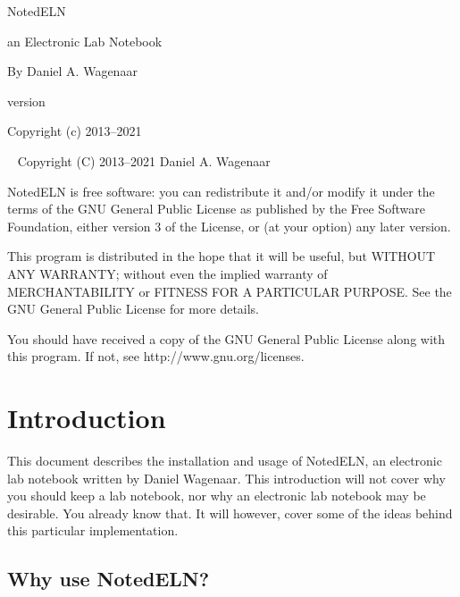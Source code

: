 \documentclass[11pt]{report}
\begin{document}
\thispagestyle{empty}
\begin{centering}
  {\Huge NotedELN}
  \vskip30pt

  {\Large an Electronic Lab Notebook}
  \vskip60pt

 
  {\large By Daniel A. Wagenaar}
  \vfill  

{\large version {}} 
\vskip10pt
  
  
  {Copyright (c) 2013--2021}
  
\end{centering}
\pagebreak
~
\vfill
\noindent Copyright (C) 2013--2021 Daniel A. Wagenaar\medskip

NotedELN is free software: you can redistribute it and/or modify
it under the terms of the GNU General Public License as published by
the Free Software Foundation, either version 3 of the License, or
(at your option) any later version.

This program is distributed in the hope that it will be useful,
but WITHOUT ANY WARRANTY; without even the implied warranty of
MERCHANTABILITY or FITNESS FOR A PARTICULAR PURPOSE.  See the
GNU General Public License for more details.

You should have received a copy of the GNU General Public License
along with this program.  If not, see http://www.gnu.org/licenses.
\pagebreak

\tableofcontents
\pagebreak

\chapter{Introduction}

This document describes the installation and usage of NotedELN, an
electronic lab notebook written by Daniel Wagenaar.  This introduction
will not cover why you should keep a lab notebook, nor why an
electronic lab notebook may be desirable. You already know that.  It
will however, cover some of the ideas behind this particular
implementation.

\section{Why use NotedELN?}
\end{document}
